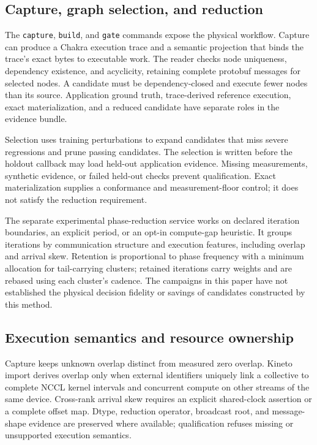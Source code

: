 \documentclass[10pt,twocolumn]{article}
\begin{document}
\subsection{Capture, graph selection, and reduction}

The \texttt{capture}, \texttt{build}, and \texttt{gate} commands expose the
physical workflow. Capture can produce a Chakra execution trace and a semantic
projection that binds the trace's exact bytes to executable work. The reader
checks node uniqueness, dependency existence, and acyclicity, retaining
complete protobuf messages for selected nodes. A candidate must be
dependency-closed and execute fewer nodes than its source. Application ground
truth, trace-derived reference execution, exact materialization, and a reduced
candidate have separate roles in the evidence bundle.

Selection uses training perturbations to expand candidates that miss severe
regressions and prune passing candidates. The selection is written before the
holdout callback may load held-out application evidence. Missing measurements,
synthetic evidence, or failed held-out checks prevent qualification. Exact
materialization supplies a conformance and measurement-floor control; it does
not satisfy the reduction requirement.

The separate experimental phase-reduction service works on declared iteration
boundaries, an explicit period, or an opt-in compute-gap heuristic. It groups
iterations by communication structure and execution features, including
overlap and arrival skew. Retention is proportional to phase frequency with a
minimum allocation for tail-carrying clusters; retained iterations carry
weights and are rebased using each cluster's cadence. The campaigns in this
paper have not established the physical decision fidelity or savings of
candidates constructed by this method.

\subsection{Execution semantics and resource ownership}

Capture keeps unknown overlap distinct from measured zero overlap. Kineto
import derives overlap only when external identifiers uniquely link a
collective to complete NCCL kernel intervals and concurrent compute on other
streams of the same device. Cross-rank arrival skew requires an explicit
shared-clock assertion or a complete offset map. Dtype, reduction operator,
broadcast root, and message-shape evidence are preserved where available;
qualification refuses missing or unsupported execution semantics.
\end{document}
